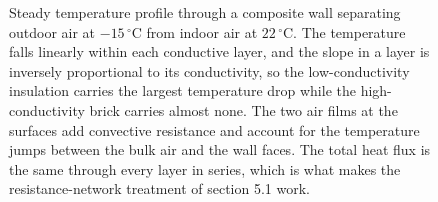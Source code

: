 \begin{figure}[htbp]
\begin{tikzpicture}[scale=1.0, >=latex]
\end{tikzpicture}
\caption[Steady temperature profile through a composite wall]{Steady
temperature profile through a composite wall separating outdoor air at
$-15\,^{\circ}\mathrm{C}$ from indoor air at $22\,^{\circ}\mathrm{C}$.
The temperature falls linearly within each conductive layer, and the
slope in a layer is inversely proportional to its conductivity, so the
low-conductivity insulation carries the largest temperature drop while
the high-conductivity brick carries almost none. The two air films at
the surfaces add convective resistance and account for the temperature
jumps between the bulk air and the wall faces. The total heat flux is
the same through every layer in series, which is what makes the
resistance-network treatment of section 5.1 work.}
\label{fig:vol04ch05:wall-temperature-profile}
\end{figure}
